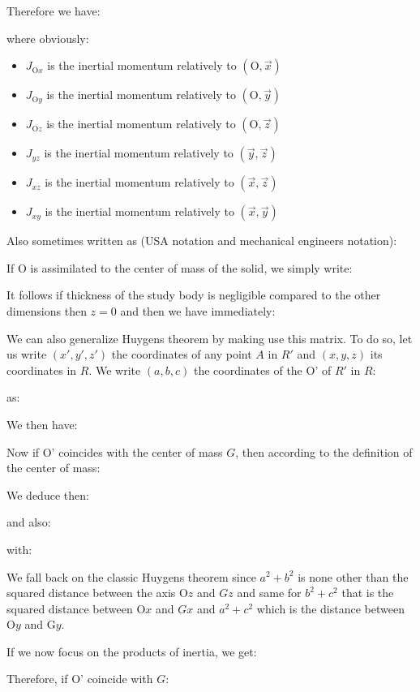    Therefore we have:
   
    where obviously:
   \begin{itemize}
       \item $J_{\text{O}x}$ is the inertial momentum relatively to $(\text{O},\vec{x})$
        \item $J_{\text{O}y}$ is the inertial momentum relatively to $(\text{O},\vec{y})$
        \item $J_{\text{O}z}$ is the inertial momentum relatively to $(\text{O},\vec{z})$
        \item $J_{yz}$ is the inertial momentum relatively to $(\vec{y},\vec{z})$
        \item $J_{xz}$ is the inertial momentum relatively to $(\vec{x},\vec{z})$
        \item $J_{xy}$ is the inertial momentum relatively to $(\vec{x},\vec{y})$
   \end{itemize}
   Also sometimes written as (USA notation and mechanical engineers notation):
   
   If O is assimilated to the center of mass of the solid, we simply write:
   
   It follows if thickness of the study body is negligible compared to the other dimensions then $z=0$ and then we have immediately:
   
   We can also generalize Huygens theorem by making use this matrix. To do so, let us write $(x', y', z')$ the coordinates of any point $A$ in $R'$ and $(x, y, z)$ its coordinates in $R$. We write $(a, b, c)$ the coordinates of the O' of $R'$ in $R$:
	
   as:
   
   We then have:
   
   Now if O' coincides with the center of mass $G$, then according to the definition of the center of mass:
   
   We deduce then:
   
   and also:
   
   with:
   
   We fall back on the classic Huygens theorem since $a^2+b^2$ is none other than the squared distance between the axis O$z$ and $Gz$ and same for $b^2+c^2$ that is the squared distance between O$x$ and $Gx$ and $a^2+c^2$ which is the distance between O$y$ and G$y$.
   
   If we now focus on the products of inertia, we get:
   
   Therefore, if O' coincide with $G$:
   
